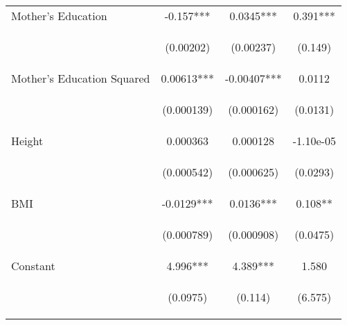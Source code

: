 \begin{table}[htpb!]
\begin{tabular}{lccc}
Mother's Education & -0.157*** & 0.0345*** & 0.391*** \\
\vspace{4pt} & \begin{footnotesize}(0.00202)\end{footnotesize} & \begin{footnotesize}(0.00237)\end{footnotesize} & \begin{footnotesize}(0.149)\end{footnotesize} \\
Mother's Education Squared & 0.00613*** & -0.00407*** & 0.0112 \\
\vspace{4pt} & \begin{footnotesize}(0.000139)\end{footnotesize} & \begin{footnotesize}(0.000162)\end{footnotesize} & \begin{footnotesize}(0.0131)\end{footnotesize} \\
Height & 0.000363 & 0.000128 & -1.10e-05 \\
\vspace{4pt} & \begin{footnotesize}(0.000542)\end{footnotesize} & \begin{footnotesize}(0.000625)\end{footnotesize} & \begin{footnotesize}(0.0293)\end{footnotesize} \\
BMI & -0.0129*** & 0.0136*** & 0.108** \\
\vspace{4pt} & \begin{footnotesize}(0.000789)\end{footnotesize} & \begin{footnotesize}(0.000908)\end{footnotesize} & \begin{footnotesize}(0.0475)\end{footnotesize} \\
Constant & 4.996*** & 4.389*** & 1.580 \\
 & \begin{footnotesize}(0.0975)\end{footnotesize} & \begin{footnotesize}(0.114)\end{footnotesize}&\begin{footnotesize}(6.575)\end{footnotesize} \\

\end{tabular}
\end{table}
